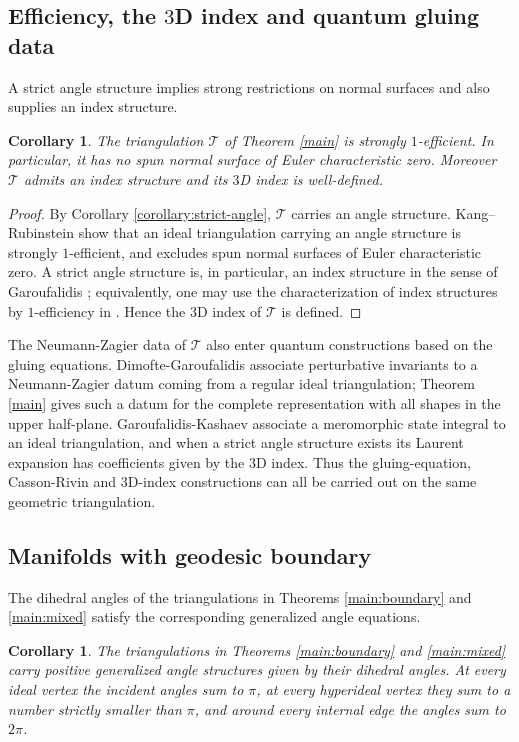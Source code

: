 \documentclass[oneside,a4paper,12pt]{article}
\newcommand{\T}{\mathcal T}
\theoremstyle{plain}
\newtheorem{corollary}[theorem]{Corollary}
\theoremstyle{definition}
\theoremstyle{remark}
\numberwithin{equation}{section}
\begin{document}
\subsection{Efficiency, the $3$D index and quantum gluing data}
A strict angle structure implies strong restrictions on normal surfaces and also supplies an index structure.

\begin{corollary}\label{corollary:efficiency-index}
The triangulation $\T$ of Theorem \ref{main} is strongly $1$-efficient. In particular, it has no spun normal surface of Euler characteristic zero. Moreover $\T$ admits an index structure and its $3$D index is well-defined.
\end{corollary}

\begin{proof}
By Corollary \ref{corollary:strict-angle}, $\T$ carries an angle structure. Kang--Rubinstein \cite[Theorem 2.5]{KR} show that an ideal triangulation carrying an angle structure is strongly $1$-efficient, and \cite[Theorem 2.8]{KR} excludes spun normal surfaces of Euler characteristic zero. A strict angle structure is, in particular, an index structure in the sense of Garoufalidis \cite{Garoufalidis}; equivalently, one may use the characterization of index structures by $1$-efficiency in \cite{GHRS}. Hence the $3$D index of $\T$ is defined.
\end{proof}

The Neumann-Zagier data of $\T$ also enter quantum constructions based on the gluing equations. Dimofte-Garoufalidis \cite{DG} associate perturbative invariants to a Neumann-Zagier datum coming from a regular ideal triangulation; Theorem \ref{main} gives such a datum for the complete representation with all shapes in the upper half-plane. Garoufalidis-Kashaev \cite{GK} associate a meromorphic state integral to an ideal triangulation, and when a strict angle structure exists its Laurent expansion has coefficients given by the $3$D index. Thus the gluing-equation, Casson-Rivin and $3$D-index constructions can all be carried out on the same geometric triangulation.

\subsection{Manifolds with geodesic boundary}
The dihedral angles of the triangulations in Theorems \ref{main:boundary} and \ref{main:mixed} satisfy the corresponding generalized angle equations.

\begin{corollary}\label{corollary:generalized-angle}
The triangulations in Theorems \ref{main:boundary} and \ref{main:mixed} carry positive generalized angle structures given by their dihedral angles. At every ideal vertex the incident angles sum to $\pi$, at every hyperideal vertex they sum to a number strictly smaller than $\pi$, and around every internal edge the angles sum to $2\pi$.
\end{corollary}
\end{document}
